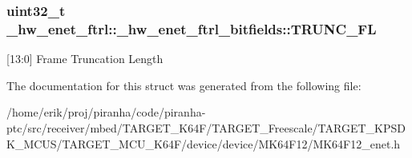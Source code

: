 \subsubsection[{\texorpdfstring{T\+R\+U\+N\+C\+\_\+\+FL}{TRUNC_FL}}]{\setlength{\rightskip}{0pt plus 5cm}uint32\+\_\+t \+\_\+hw\+\_\+enet\+\_\+ftrl\+::\+\_\+hw\+\_\+enet\+\_\+ftrl\+\_\+bitfields\+::\+T\+R\+U\+N\+C\+\_\+\+FL}\hypertarget{struct__hw__enet__ftrl_1_1__hw__enet__ftrl__bitfields_a737dad9336e925869ad355445db6c908}{}\label{struct__hw__enet__ftrl_1_1__hw__enet__ftrl__bitfields_a737dad9336e925869ad355445db6c908}
\mbox{[}13\+:0\mbox{]} Frame Truncation Length 

The documentation for this struct was generated from the following file\+:\begin{DoxyCompactItemize}
\item 
/home/erik/proj/piranha/code/piranha-\/ptc/src/receiver/mbed/\+T\+A\+R\+G\+E\+T\+\_\+\+K64\+F/\+T\+A\+R\+G\+E\+T\+\_\+\+Freescale/\+T\+A\+R\+G\+E\+T\+\_\+\+K\+P\+S\+D\+K\+\_\+\+M\+C\+U\+S/\+T\+A\+R\+G\+E\+T\+\_\+\+M\+C\+U\+\_\+\+K64\+F/device/device/\+M\+K64\+F12/M\+K64\+F12\+\_\+enet.\+h\end{DoxyCompactItemize}
